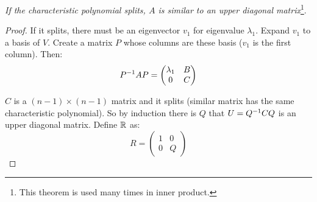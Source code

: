 \begin{theorem}\label{split_means_upper_trangular}
    \emph{If the characteristic polynomial splits, $A$ is similar to an upper diagonal matrix}\footnote{This theorem is used many times in inner product.}.    
\end{theorem}
\begin{proof}
    If it splits, there must be an eigenvector $v_1$ for eigenvalue $\lambda_1$. Expand $v_1$ to a basis of $V$. Create a matrix $P$ whose columns are these basis ($v_1$ is the first column). Then:
    \begin{equation*}
        {P}^{-1} A P = \begin{pmatrix}
            \lambda_1 & B \\
            0 & C
        \end{pmatrix}
    \end{equation*}
    
    $C$ is a $(n-1) \times (n-1)$ matrix and it splits (similar matrix has the same characteristic polynomial). So by induction there is $Q$ that $U= {Q}^{-1} C Q$ is an upper diagonal matrix. Define $\mathbb{R}$ as:
    \begin{equation*}
        R = \begin{pmatrix}
            1 & 0 \\
            0 & Q
        \end{pmatrix}
    \end{equation*}
    

\end{proof}
